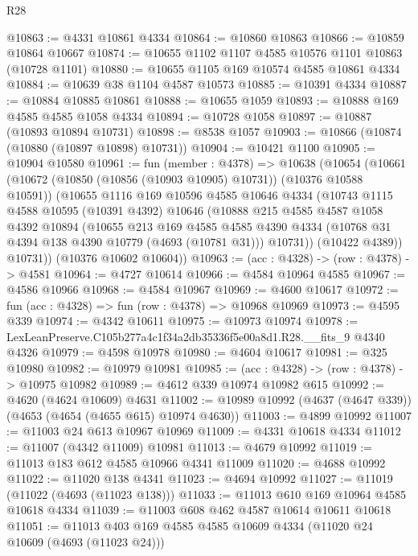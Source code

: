 \begin{lexlean}{R28}
\begin{coremodule}
@10863 := @4331 @10861 @4334
@10864 := @10860 @10863
@10866 := @10859 @10864 @10667
@10874 := @10655 @1102 @1107 @4585 @10576 @1101 @10863 (@10728 @1101)
@10880 := @10655 @1105 @169 @10574 @4585 @10861 @4334
@10884 := @10639 @38 @1104 @4587 @10573
@10885 := @10391 @4334
@10887 := @10884 @10885 @10861
@10888 := @10655 @1059
@10893 := @10888 @169 @4585 @4585 @1058 @4334
@10894 := @10728 @1058
@10897 := @10887 (@10893 @10894 @10731)
@10898 := @8538 @1057
@10903 := @10866 (@10874 (@10880 (@10897 @10898) @10731))
@10904 := @10421 @1100
@10905 := @10904 @10580
@10961 := fun (member : @4378) =>
  @10638
    (@10654
      (@10661
        (@10672 (@10850 (@10856 (@10903 @10905) @10731)) (@10376 @10588 @10591))
        (@10655
          @1116
          @169
          @10596
          @4585
          @10646
          @4334
          (@10743
            @1115
            @4588
            @10595
            (@10391 @4392)
            @10646
            (@10888
              @215
              @4585
              @4587
              @1058
              @4392
              @10894
              (@10655
                @213
                @169
                @4585
                @4585
                @4390
                @4334
                (@10768 @31 @4394 @138 @4390 @10779 (@4693 (@10781 @31)))
                @10731))
            (@10422 @4389))
          @10731))
      (@10376 @10602 @10604))
@10963 := (acc : @4328) -> (row : @4378) -> @4581
@10964 := @4727 @10614
@10966 := @4584 @10964 @4585
@10967 := @4586 @10966
@10968 := @4584 @10967
@10969 := @4600 @10617
@10972 := fun (acc : @4328) => fun (row : @4378) => @10968 @10969
@10973 := @4595 @339
@10974 := @4342 @10611
@10975 := @10973 @10974
@10978 := LexLeanPreserve.C105b277a4c1f34a2db35336f5e00a8d1.R28.__fits_9 @4340 @4326
@10979 := @4598 @10978
@10980 := @4604 @10617
@10981 := @325 @10980
@10982 := @10979 @10981
@10985 := (acc : @4328) -> (row : @4378) -> @10975 @10982
@10989 := @4612 @339 @10974 @10982 @615
@10992 := @4620 (@4624 @10609) @4631
@11002 := @10989 @10992 (@4637 (@4647 @339)) (@4653 (@4654 (@4655 @615) @10974 @4630))
@11003 := @4899 @10992
@11007 := @11003 @24 @613 @10967 @10969
@11009 := @4331 @10618 @4334
@11012 := @11007 (@4342 @11009) @10981
@11013 := @4679 @10992
@11019 := @11013 @183 @612 @4585 @10966 @4341 @11009
@11020 := @4688 @10992
@11022 := @11020 @138 @4341
@11023 := @4694 @10992
@11027 := @11019 (@11022 (@4693 (@11023 @138)))
@11033 := @11013 @610 @169 @10964 @4585 @10618 @4334
@11039 := @11003 @608 @462 @4587 @10614 @10611 @10618
@11051 := @11013 @403 @169 @4585 @4585 @10609 @4334 (@11020 @24 @10609 (@4693 (@11023 @24)))

\end{coremodule}
\end{lexlean}
